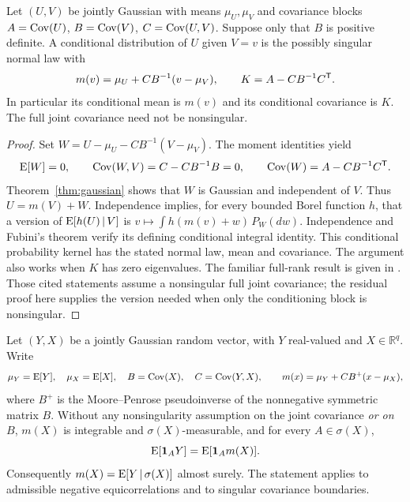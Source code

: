 \begin{theorem}
\label{thm:regression}
Let \((U,V)\) be jointly Gaussian with means \(\mu_U,\mu_V\) and covariance
blocks \(A=\operatorname{Cov}(U)\), \(B=\operatorname{Cov}(V)\), \(C=\operatorname{Cov}(U,V)\). Suppose only
that \(B\) is positive definite. A conditional distribution of \(U\) given
\(V=v\) is the possibly singular normal law with
\[
  m(v)=\mu_U+CB^{-1}(v-\mu_V),\qquad
  K=A-CB^{-1}C^{\mathsf{T}}.
\]
In particular its conditional mean is \(m(v)\) and its conditional covariance
is \(K\). The full joint covariance need not be nonsingular.
\end{theorem}

\begin{proof}
Set \(W=U-\mu_U-CB^{-1}(V-\mu_V)\). The moment identities yield
\[
  \operatorname{E}[W]=0,\qquad \operatorname{Cov}(W,V)=C-CB^{-1}B=0,
  \qquad \operatorname{Cov}(W)=A-CB^{-1}C^{\mathsf{T}}.
\]
Theorem~\ref{thm:gaussian} shows that \(W\) is Gaussian and independent of
\(V\). Thus \(U=m(V)+W\). Independence implies, for every bounded Borel
function \(h\), that a version of \(\operatorname{E}[h(U)\,\vert\, V]\) is
\(v\mapsto\int h(m(v)+w)\,P_W(dw)\). Independence and Fubini's theorem
\cite[Theorem~1.7.2]{durrett2019} verify its defining conditional integral
identity. This conditional probability kernel has the stated normal law,
mean and covariance. The argument
also works when \(K\) has zero eigenvalues.
The familiar full-rank result is given in
\cite[Theorems~3.5.1--3.5.2 and equations~(3.44)--(3.45), author-hosted draft]{gallager2013}.
Those cited statements assume a nonsingular full joint covariance; the
residual proof here supplies the version needed when only the conditioning
block is nonsingular.
\end{proof}


\begin{theorem}
\label{thm:gaussian-ce-event-integral}
Let \((Y,X)\) be a jointly Gaussian random vector, with \(Y\) real-valued
and \(X\in\mathbb R^q\). Write
\[
 \mu_Y=\operatorname{E}[Y],\quad \mu_X=\operatorname{E}[X],\quad
 B=\operatorname{Cov}(X),\quad C=\operatorname{Cov}(Y,X),
 \qquad m(x)=\mu_Y+CB^+(x-\mu_X),
\]
where \(B^+\) is the Moore--Penrose pseudoinverse of the nonnegative
symmetric matrix \(B\). Without any nonsingularity assumption on the
joint covariance \emph{or on \(B\)}, \(m(X)\) is integrable and
\(\sigma(X)\)-measurable, and for every \(A\in\sigma(X)\),
\begin{equation}
 \operatorname{E}[\mathbf{1}_A Y]=\operatorname{E}[\mathbf{1}_A m(X)].
 \label{eq:gaussian-ce-event-integral}
\end{equation}
Consequently \(m(X)=\operatorname{E}[Y\,\vert\,\sigma(X)]\) almost surely.
The statement applies to admissible negative equicorrelations and to
singular covariance boundaries.
\end{theorem}

